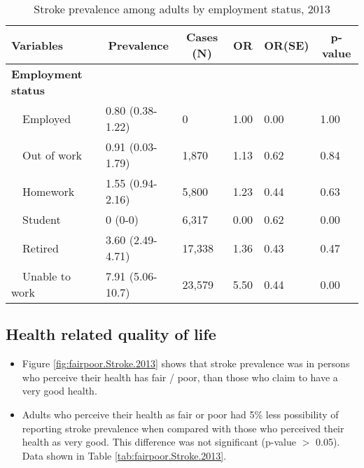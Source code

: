 \begin{table}[H]
\caption{Stroke prevalence  among adults by employment status, 2013\label{tab:employ.Stroke.2013}} 
\begin{center}
\begin{tabular}{llllll}
\hline\hline
\multicolumn{1}{l}{Variables}&\multicolumn{1}{c}{Prevalence}&\multicolumn{1}{c}{Cases (N)}&\multicolumn{1}{c}{OR}&\multicolumn{1}{c}{OR(SE)}&\multicolumn{1}{c}{p-value}\tabularnewline
\hline
{\bfseries Employment status}&&&&&\tabularnewline
~~Employed&0.80 (0.38-1.22)&     0&1.00&0.00&1.00\tabularnewline
~~Out of work&0.91 (0.03-1.79)& 1,870&1.13&0.62&0.84\tabularnewline
~~Homework&1.55 (0.94-2.16)& 5,800&1.23&0.44&0.63\tabularnewline
~~Student&0 (0-0)& 6,317&0.00&0.62&0.00\tabularnewline
~~Retired&3.60 (2.49-4.71)&17,338&1.36&0.43&0.47\tabularnewline
~~Unable to work&7.91 (5.06-10.7)&23,579&5.50&0.44&0.00\tabularnewline
\hline
\end{tabular}\end{center}

\end{table}


 \newpage
\subsection{Health related quality of life}


 \begin{itemize}

\item Figure \ref{fig:fairpoor.Stroke.2013} shows that stroke prevalence  was 
 in persons who perceive their health has fair / poor,
than those who claim to have a very good health.

\item Adults who perceive their health as fair or poor had 5\% less possibility of reporting stroke prevalence when compared with those who perceived their health as very good. This difference was not significant (p-value $>$ 0.05). Data shown in Table \ref{tab:fairpoor.Stroke.2013}.

\end{itemize}

